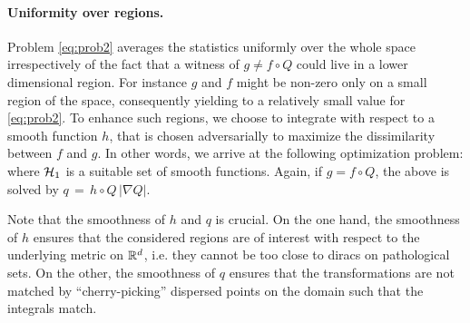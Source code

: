 \paragraph{Uniformity over regions.} Problem \eqref{eq:prob2} averages the statistics uniformly over the whole space irrespectively of the fact that a witness of $g \neq f \circ Q$ could live in a lower dimensional region. For instance $g$ and $f$ might be non-zero only on a small region of the space, consequently yielding to a relatively small value for \cref{eq:prob2}. To enhance such regions, we choose to integrate with respect to a smooth function $h$, that is chosen adversarially to maximize the dissimilarity between $f$ and $g$.  %
In other words, we arrive at the following optimization problem:
where $\mathcal H_1$ is a suitable set of smooth functions.
Again, if $g = f\circ Q$, the above is solved by $q \,=\, h\circ Q \, |\nabla Q|$.



Note that the smoothness of $h$ and $q$ is crucial. On the one hand, the smoothness of $h$ ensures that the considered regions are of interest with respect to the underlying metric on $\mathbb R^d$, i.e. they cannot be too close to diracs on pathological sets. On the other, the smoothness of $q$ ensures that the transformations are not matched by ``cherry-picking'' dispersed points on the domain such that the integrals match.



